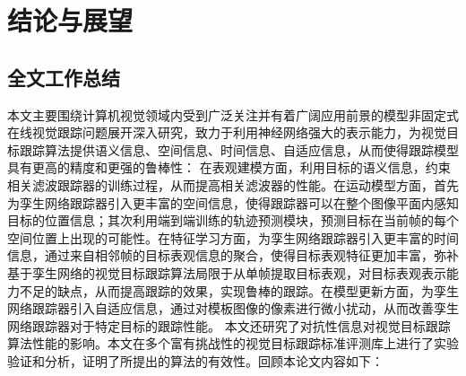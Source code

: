 \chapter{结论与展望}\label{chap:conclusion}
\section{全文工作总结}
本文主要围绕计算机视觉领域内受到广泛关注并有着广阔应用前景的模型非固定式在线视觉跟踪问题展开深入研究，致力于利用神经网络强大的表示能力，为视觉目标跟踪算法提供语义信息、空间信息、时间信息、自适应信息，从而使得跟踪模型具有更高的精度和更强的鲁棒性：
在表观建模方面，利用目标的语义信息，约束相关滤波跟踪器的训练过程，从而提高相关滤波器的性能。在运动模型方面，首先为孪生网络跟踪器引入更丰富的空间信息，使得跟踪器可以在整个图像平面内感知目标的位置信息；其次利用端到端训练的轨迹预测模块，预测目标在当前帧的每个空间位置上出现的可能性。在特征学习方面，为孪生网络跟踪器引入更丰富的时间信息，通过来自相邻帧的目标表观信息的聚合，使得目标表观特征更加丰富，弥补基于孪生网络的视觉目标跟踪算法局限于从单帧提取目标表观，对目标表观表示能力不足的缺点，从而提高跟踪的效果，实现鲁棒的跟踪。在模型更新方面，为孪生网络跟踪器引入自适应信息，通过对模板图像的像素进行微小扰动，从而改善孪生网络跟踪器对于特定目标的跟踪性能。
本文还研究了对抗性信息对视觉目标跟踪算法性能的影响。本文在多个富有挑战性的视觉目标跟踪标准评测库上进行了实验验证和分析，证明了所提出的算法的有效性。回顾本论文内容如下：
